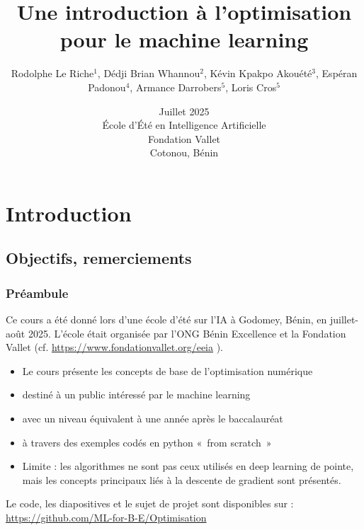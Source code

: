 \documentclass[12pt]{beamer}
\begin{document}
\title
[~Optimisation pour l'apprentissage automatique]
{Une introduction à l'optimisation pour le machine learning}
\author
[Le Riche et al.]
{\normalsize Rodolphe Le Riche$^1$, Dédji Brian Whannou$^2$, Kévin Kpakpo Akouété$^3$, Espéran Padonou$^4$, Armance Darrobers$^5$, Loris Cros$^5$} 
\date[Juillet 2025]{Juillet 2025 \\
École d'Été en Intelligence Artificielle \\
Fondation Vallet \\
Cotonou, Bénin} 
\begin{frame}
\titlepage
\end{frame}

\section{Introduction}
\subsection{Objectifs, remerciements}

\begin{frame}
\frametitle{Préambule}
Ce cours a été donné lors d'une école d'été sur l'IA à Godomey, Bénin, en juillet-août 2025.  
L'école était organisée par l'ONG Bénin Excellence et la Fondation Vallet (cf. 
{\scriptsize
\url{https://www.fondationvallet.org/eeia}}
).
\begin{itemize}
\item Le cours présente les concepts de base de l'optimisation numérique
\item destiné à un public intéressé par le machine learning
\item avec un niveau équivalent à une année après le baccalauréat
\item à travers des exemples codés en python « from scratch »
\item Limite : les algorithmes ne sont pas ceux utilisés en deep learning de pointe, mais les concepts principaux liés à la descente de gradient sont présentés.
\end{itemize}
Le code, les diapositives et le sujet de projet sont disponibles sur : {\scriptsize \url{https://github.com/ML-for-B-E/Optimisation}}
\end{frame}
\end{document}
